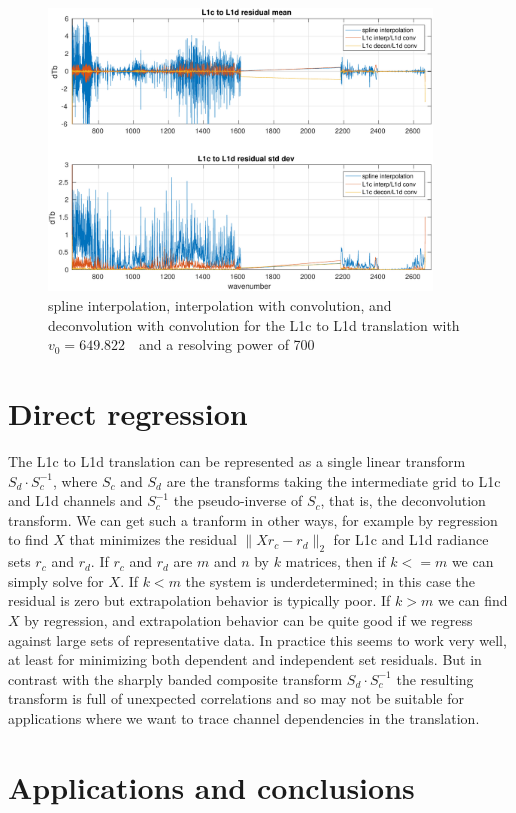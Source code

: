 \documentclass[11pt]{article}
\begin{document}
\begin{figure} %
  \centering
  \includegraphics[height=7.5cm]{figures/CtoD_interp_diff.pdf}
  \caption{spline interpolation, interpolation with convolution, 
    and deconvolution with convolution for the {\airs} L1c to L1d
    translation with $v_0=649.822$~\wn\ and a resolving power of 700}
  \label{interpL1d}
\end{figure}

\FloatBarrier
\section{Direct regression}
\label{dregr}

The L1c to L1d translation can be represented as a single linear
transform $S_d\cdot S_c^{-1}$, where $S_c$ and $S_d$ are the
transforms taking the intermediate grid to L1c and L1d channels and
$S_c^{-1}$ the pseudo-inverse of $S_c$, that is, the deconvolution
transform.  We can get such a tranform in other ways, for example by
regression to find $X$ that minimizes the residual $\|X r_c -
r_d\|_2$ for L1c and L1d radiance sets $r_c$ and $r_d$.  If $r_c$ and
$r_d$ are $m$ and $n$ by $k$ matrices, then if $k <= m$ we can simply
solve for $X$.  If $k < m$ the system is underdetermined; in this
case the residual is zero but extrapolation behavior is typically
poor.  If $k > m$ we can find $X$ by regression, and extrapolation
behavior can be quite good if we regress against large sets of
representative data.  In practice this seems to work very well, at
least for minimizing both dependent and independent set residuals.
But in contrast with the sharply banded composite transform $S_d\cdot
S_c^{-1}$ the resulting transform is full of unexpected correlations
and so may not be suitable for applications where we want to trace
channel dependencies in the translation.

\FloatBarrier
\section{Applications and conclusions}
\label{appcon}

\FloatBarrier


\end{document}
